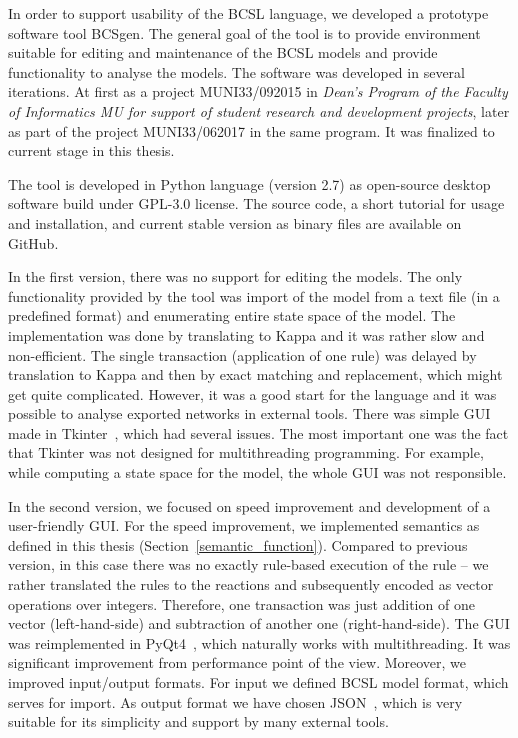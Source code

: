 \documentclass[12pt]{fithesis2}
\begin{document}
In order to support usability of the BCSL language, we developed a prototype software tool BCSgen. The general goal of the tool is to provide environment suitable for editing and maintenance of the BCSL models and provide functionality to analyse the models. The software was developed in several iterations. At first as a project MUNI33/092015 in \emph{Dean's Program of the Faculty of Informatics MU for support of student research and development projects}, later as part of the project MUNI33/062017 in the same program. It was finalized to current stage in this thesis.

The tool is developed in Python language (version 2.7) as open-source desktop software build under GPL-3.0 license. The source code, a short tutorial for usage and installation, and current stable version as binary files are available on GitHub\footnotemark[1].

In the first version, there was no support for editing the models. The only functionality provided by the tool was import of the model from a text file (in a predefined format) and enumerating entire state space of the model. The implementation was done by translating to Kappa and it was rather slow and non-efficient. The single transaction (application of one rule) was delayed by translation to Kappa and then by exact matching and replacement, which might get quite complicated. However, it was a good start for the language and it was possible to analyse exported networks in external tools. There was simple GUI made in Tkinter~\cite{Tkinter}, which had several issues. The most important one was the fact that Tkinter was not designed for multithreading programming. For example, while computing a state space for the model, the whole GUI was not responsible.

In the second version, we focused on speed improvement and development of a user-friendly GUI. For the speed improvement, we implemented semantics as defined in this thesis (Section~\ref{semantic_function}). Compared to previous version, in this case there was no exactly rule-based execution of the rule -- we rather translated the rules to the reactions and subsequently encoded as vector operations over integers. Therefore, one transaction was just addition of one vector (left-hand-side) and subtraction of another one (right-hand-side). The GUI was reimplemented in PyQt4~\cite{summerfield2007rapid}, which naturally works with multithreading. It was significant improvement from performance point of the view. Moreover, we improved input/output formats. For input we defined BCSL model format, which serves for import. As output format we have chosen JSON~\cite{json}, which is very suitable for its simplicity and support by many external tools.
\end{document}
